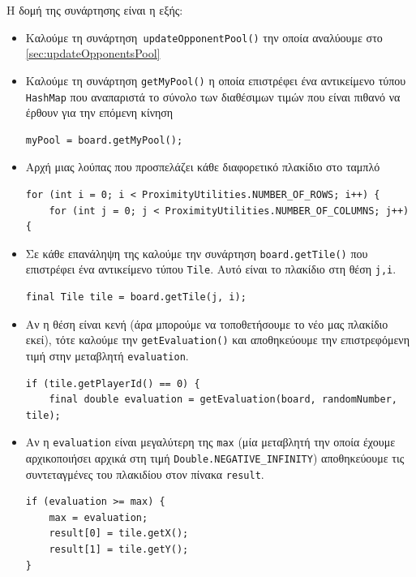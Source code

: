 Η δομή της συνάρτησης είναι η εξής:\begin{itemize}
\item Καλούμε τη συνάρτηση\lstinline! updateOpponentPool()! την 
οποία αναλύουμε στο \hyperref[sec:updateOpponentsPool]{\ref{sec:updateOpponentsPool}}

\item Καλούμε τη συνάρτηση \lstinline!getMyPool()! η οποία επιστρέφει ένα αντικείμενο τύπου \lstinline!HashMap! που αναπαριστά το σύνολο των διαθέσιμων τιμών που είναι πιθανό να έρθουν για την επόμενη κίνηση
\begin{lstlisting}[numbers=none, aboveskip=\smallskipamount, belowskip=\smallskipamount, captionpos=none]
myPool = board.getMyPool();
\end{lstlisting}

\item Αρχή μιας λούπας που προσπελάζει κάθε διαφορετικό πλακίδιο στο ταμπλό
\begin{lstlisting}[numbers=none, aboveskip=\smallskipamount, belowskip=\smallskipamount, captionpos=none]
for (int i = 0; i < ProximityUtilities.NUMBER_OF_ROWS; i++) {
    for (int j = 0; j < ProximityUtilities.NUMBER_OF_COLUMNS; j++) {
\end{lstlisting}

\item Σε κάθε επανάληψη της καλούμε την συνάρτηση \lstinline!board.getTile()! που επιστρέφει ένα αντικείμενο τύπου \lstinline!Tile!. Αυτό είναι το πλακίδιο στη θέση \lstinline!j,i!.
\begin{lstlisting}[numbers=none, aboveskip=\smallskipamount, belowskip=\smallskipamount, captionpos=none]
final Tile tile = board.getTile(j, i);
\end{lstlisting}

\item Αν η θέση είναι κενή (άρα μπορούμε να τοποθετήσουμε το νέο μας πλακίδιο εκεί),
τότε καλούμε την \lstinline!getEvaluation()! και αποθηκεύουμε την επιστρεφόμενη τιμή 
στην μεταβλητή \lstinline!evaluation!.
\begin{lstlisting}[breaklines=true, numbers=none, aboveskip=\smallskipamount, belowskip=\smallskipamount, captionpos=none]
if (tile.getPlayerId() == 0) {
    final double evaluation = getEvaluation(board, randomNumber, tile);
\end{lstlisting}

\item Αν η \lstinline!evaluation! είναι μεγαλύτερη της 
\lstinline!max! (μία μεταβλητή την οποία έχουμε αρχικοποιήσει αρχικά στη τιμή \lstinline!Double.NEGATIVE_INFINITY!) αποθηκεύουμε 
τις συντεταγμένες του πλακιδίου στον πίνακα \lstinline!result!.
\begin{lstlisting}[breaklines=true, numbers=none, aboveskip=\smallskipamount, belowskip=\smallskipamount, captionpos=none]
if (evaluation >= max) {
    max = evaluation;
    result[0] = tile.getX();
    result[1] = tile.getY();
}
\end{lstlisting}


\end{itemize}
